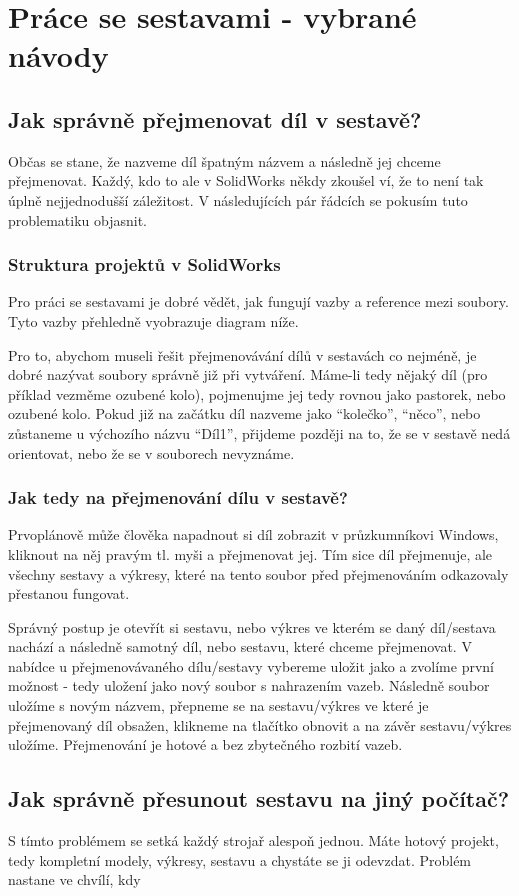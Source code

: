 \newpage

\chapter{Práce se sestavami - vybrané návody}

\section{Jak správně přejmenovat díl v sestavě?}
Občas se stane, že nazveme díl špatným názvem a následně jej chceme přejmenovat.
Každý, kdo to ale v SolidWorks někdy zkoušel ví, že to není tak úplně nejjednodušší záležitost.
V následujících pár řádcích se pokusím tuto problematiku objasnit.

\subsection*{Struktura projektů v SolidWorks}
Pro práci se sestavami je dobré vědět, jak fungují vazby a reference mezi soubory.
Tyto vazby přehledně vyobrazuje diagram níže.

Pro to, abychom museli řešit přejmenovávání dílů v sestavách co nejméně, je dobré nazývat soubory správně již při vytváření.
Máme-li tedy nějaký díl (pro příklad vezměme ozubené kolo), pojmenujme jej tedy rovnou jako pastorek, nebo ozubené kolo.
Pokud již na začátku díl nazveme jako \enquote{kolečko}, \enquote{něco}, nebo zůstaneme u výchozího názvu \enquote{Díl1}, přijdeme později na to, že se v sestavě nedá orientovat, nebo že se v souborech nevyznáme.

\subsection*{Jak tedy na přejmenování dílu v sestavě?}
Prvoplánově může člověka napadnout si díl zobrazit v průzkumníkovi Windows, kliknout na něj pravým tl. myši a přejmenovat jej. 
Tím sice díl přejmenuje, ale všechny sestavy a výkresy, které na tento soubor před přejmenováním odkazovaly přestanou fungovat.

Správný postup je otevřít si sestavu, nebo výkres ve kterém se daný díl/sestava nachází a následně samotný díl, nebo sestavu, které chceme přejmenovat.
V nabídce  u přejmenovávaného dílu/sestavy vybereme uložit jako a zvolíme první možnost - tedy uložení jako nový soubor s nahrazením vazeb.
Následně soubor uložíme s novým názvem, přepneme se na sestavu/výkres ve které je přejmenovaný díl obsažen, klikneme na tlačítko obnovit a na závěr sestavu/výkres uložíme.
Přejmenování je hotové a bez zbytečného rozbití vazeb.

\section{Jak správně přesunout sestavu na jiný počítač?}
S tímto problémem se setká každý strojař alespoň jednou.
Máte hotový projekt, tedy kompletní modely, výkresy, sestavu a chystáte se ji odevzdat.
Problém nastane ve chvílí, kdy 

\newpage